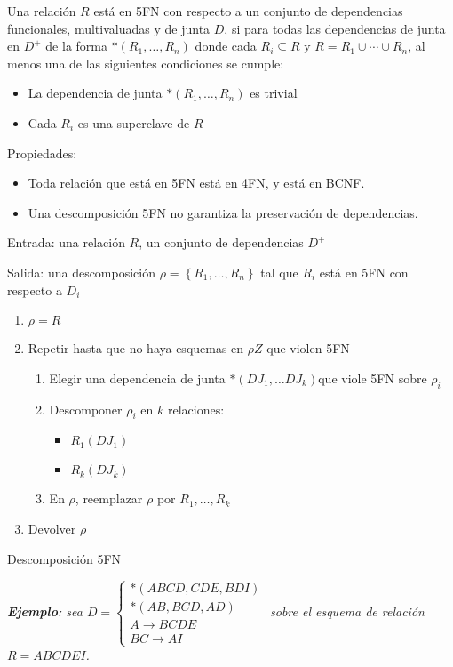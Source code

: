 \documentclass[a4paper, twoside]{article}
\begin{document}
Una relación $R$ está en 5FN con respecto a un conjunto de dependencias
funcionales, multivaluadas y de junta $D$, si para todas las dependencias
de junta en $D^{+}$ de la forma $*\left(R_{1},\ldots,R_{n}\right)$
donde cada $R_{i}\subseteq R$ y $R=R_{1}\cup\cdots\cup R_{n}$, al
menos una de las siguientes condiciones se cumple:
\begin{itemize}
\item La dependencia de junta $*\left(R_{1},\ldots,R_{n}\right)$ es trivial
\item Cada $R_{i}$ es una superclave de $R$
\end{itemize}
Propiedades:
\begin{itemize}
\item Toda relación que está en 5FN está en 4FN, y está en BCNF.
\item Una descomposición 5FN no garantiza la preservación de dependencias.
\end{itemize}
\begin{algorithm}[H]
Entrada: una relación $R$, un conjunto de dependencias $D^{+}$

Salida: una descomposición $\rho=\left\{ R_{1},\ldots,R_{n}\right\} $
tal que $R_{i}$ está en 5FN con respecto a $D_{i}$
\begin{enumerate}
\item $\rho=R$
\item Repetir hasta que no haya esquemas en $\rho Z$ que violen 5FN

\begin{enumerate}
\item Elegir una dependencia de junta $*\left(DJ_{1},\ldots DJ_{k}\right)$que
viole 5FN sobre $\rho_{i}$
\item Descomponer $\rho_{i}$ en $k$ relaciones:

\begin{itemize}
\item $R_{1}\left(DJ_{1}\right)$
\item $R_{k}\left(DJ_{k}\right)$
\end{itemize}
\item En $\rho$, reemplazar $\rho$ por $R_{1},\ldots,R_{k}$
\end{enumerate}
\item Devolver $\rho$
\end{enumerate}
\protect\caption{Descomposición 5FN}
\end{algorithm}


\textbf{\emph{Ejemplo}}\emph{: sea $D=\begin{cases}
*\left(ABCD,CDE,BDI\right)\\
*\left(AB,BCD,AD\right)\\
A\to BCDE\\
BC\to AI
\end{cases}$ sobre el esquema de relación $R=ABCDEI$. }
\end{document}
